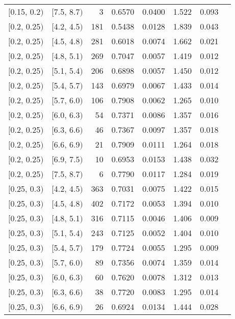 \begin{longtable}{| l | l | r | r | r | r | r | r |}
        $[$0.15, 0.2$)$ & $[$7.5, 8.7$)$ & 3   & 0.6570 & 0.0400 & 1.522 & 0.093 \\
        $[$0.2, 0.25$)$ & $[$4.2, 4.5$)$ & 181 & 0.5438 & 0.0128 & 1.839 & 0.043 \\
        $[$0.2, 0.25$)$ & $[$4.5, 4.8$)$ & 281 & 0.6018 & 0.0074 & 1.662 & 0.021 \\
        $[$0.2, 0.25$)$ & $[$4.8, 5.1$)$ & 269 & 0.7047 & 0.0057 & 1.419 & 0.012 \\
        $[$0.2, 0.25$)$ & $[$5.1, 5.4$)$ & 206 & 0.6898 & 0.0057 & 1.450 & 0.012 \\
        $[$0.2, 0.25$)$ & $[$5.4, 5.7$)$ & 143 & 0.6979 & 0.0067 & 1.433 & 0.014 \\
        $[$0.2, 0.25$)$ & $[$5.7, 6.0$)$ & 106 & 0.7908 & 0.0062 & 1.265 & 0.010 \\
        $[$0.2, 0.25$)$ & $[$6.0, 6.3$)$ & 54  & 0.7371 & 0.0086 & 1.357 & 0.016 \\
        $[$0.2, 0.25$)$ & $[$6.3, 6.6$)$ & 46  & 0.7367 & 0.0097 & 1.357 & 0.018 \\
        $[$0.2, 0.25$)$ & $[$6.6, 6.9$)$ & 21  & 0.7909 & 0.0111 & 1.264 & 0.018 \\
        $[$0.2, 0.25$)$ & $[$6.9, 7.5$)$ & 10  & 0.6953 & 0.0153 & 1.438 & 0.032 \\
        $[$0.2, 0.25$)$ & $[$7.5, 8.7$)$ & 6   & 0.7790 & 0.0117 & 1.284 & 0.019 \\
        $[$0.25, 0.3$)$ & $[$4.2, 4.5$)$ & 363 & 0.7031 & 0.0075 & 1.422 & 0.015 \\
        $[$0.25, 0.3$)$ & $[$4.5, 4.8$)$ & 402 & 0.7172 & 0.0053 & 1.394 & 0.010 \\
        $[$0.25, 0.3$)$ & $[$4.8, 5.1$)$ & 316 & 0.7115 & 0.0046 & 1.406 & 0.009 \\
        $[$0.25, 0.3$)$ & $[$5.1, 5.4$)$ & 243 & 0.7125 & 0.0052 & 1.404 & 0.010 \\
        $[$0.25, 0.3$)$ & $[$5.4, 5.7$)$ & 179 & 0.7724 & 0.0055 & 1.295 & 0.009 \\
        $[$0.25, 0.3$)$ & $[$5.7, 6.0$)$ & 89  & 0.7356 & 0.0074 & 1.359 & 0.014 \\
        $[$0.25, 0.3$)$ & $[$6.0, 6.3$)$ & 60  & 0.7620 & 0.0078 & 1.312 & 0.013 \\
        $[$0.25, 0.3$)$ & $[$6.3, 6.6$)$ & 38  & 0.7720 & 0.0083 & 1.295 & 0.014 \\
        $[$0.25, 0.3$)$ & $[$6.6, 6.9$)$ & 26  & 0.6924 & 0.0134 & 1.444 & 0.028 \\

\end{longtable}
